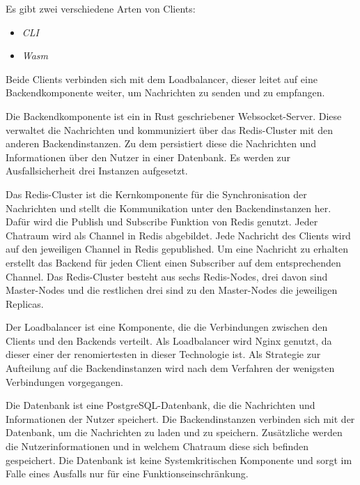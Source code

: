 \begin{description}[style=nextline]
    \item [Clients] Es gibt zwei verschiedene Arten von Clients: 
        \begin{itemize} 
            \item \textit{\ac{CLI}} 
            \item \textit{\ac{Wasm}}
        \end{itemize}
        Beide Clients verbinden sich mit dem Loadbalancer, dieser leitet auf eine Backendkomponente weiter, um Nachrichten zu senden und zu empfangen.

    \item [Backend] Die Backendkomponente ist ein in Rust geschriebener Websocket-Server.
        Diese verwaltet die Nachrichten und kommuniziert über das Redis-Cluster mit den anderen Backendinstanzen.
        Zu dem persistiert diese die Nachrichten und Informationen über den Nutzer in einer Datenbank.
        Es werden zur Ausfallsicherheit drei Instanzen aufgesetzt.

    \item [Redis-Cluster] Das Redis-Cluster ist die Kernkomponente für die Synchronisation der Nachrichten und stellt die Kommunikation unter den Backendinstanzen her.
        Dafür wird die Publish und Subscribe Funktion von Redis genutzt.
        Jeder Chatraum wird als Channel in Redis abgebildet.
        Jede Nachricht des Clients wird auf den jeweiligen Channel in Redis gepublished.
        Um eine Nachricht zu erhalten erstellt das Backend für jeden Client einen Subscriber auf dem entsprechenden Channel.
        Das Redis-Cluster besteht aus sechs Redis-Nodes, drei davon sind Master-Nodes und die restlichen drei sind zu den Master-Nodes die jeweiligen Replicas.

    \item [Loadbalancer] Der Loadbalancer ist eine Komponente, die die Verbindungen zwischen den Clients und den Backends verteilt.
        Als Loadbalancer wird Nginx genutzt, da dieser einer der renomiertesten in dieser Technologie ist.
        Als Strategie zur Aufteilung auf die Backendinstanzen wird nach dem Verfahren der wenigsten Verbindungen vorgegangen.

    \item [Datenbank] Die Datenbank ist eine PostgreSQL-Datenbank, die die Nachrichten und Informationen der Nutzer speichert.
        Die Backendinstanzen verbinden sich mit der Datenbank, um die Nachrichten zu laden und zu speichern.
        Zusätzliche werden die Nutzerinformationen und in welchem Chatraum diese sich befinden gespeichert.
        Die Datenbank ist keine Systemkritischen Komponente und sorgt im Falle eines Ausfalls nur für eine Funktionseinschränkung.
\end{description}


